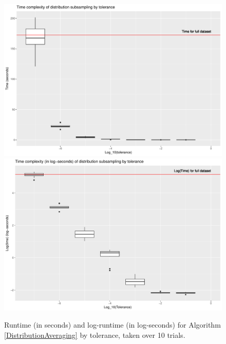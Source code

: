 \documentclass{article}
\begin{document}
\begin{figure}
    \includegraphics[width=\linewidth]{Figures/time_by_tol.pdf}
    \includegraphics[width=\linewidth]{Figures/log_time_by_tol.pdf}
    \caption{Runtime (in seconds) and log-runtime (in log-seconds) for Algorithm \ref{DistributionAveraging} by tolerance, taken over 10 trials.}
    \label{fig:Times}
\end{figure}
\end{document}
